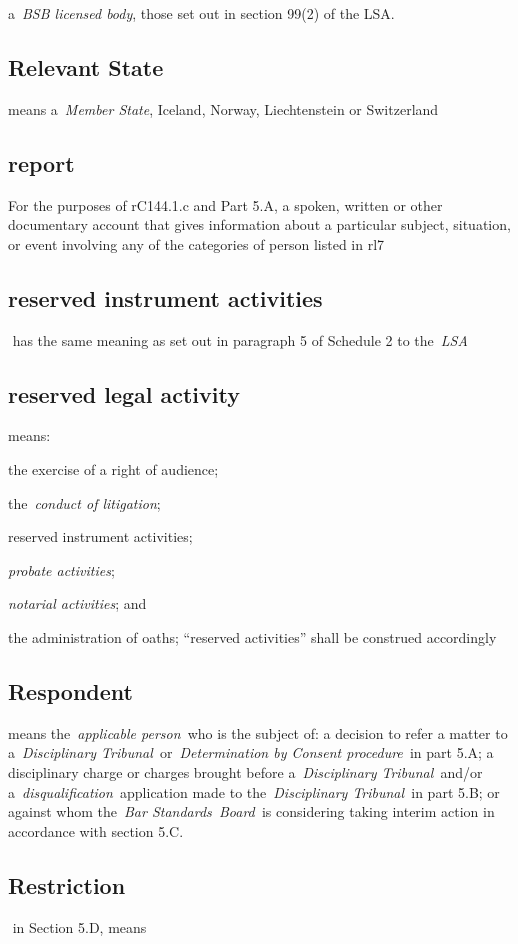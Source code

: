   a~\emph{BSB licensed body}, those set out in section 99(2) of the
  LSA.\la  \subsection{Relevant State } means a~\emph{Member State}, Iceland,
  Norway, Liechtenstein or Switzerland  \subsection{report }For the purposes of rC144.1.c and Part 5.A, a spoken,
  written or other documentary account that gives information about a
  particular subject, situation, or event involving any of the
  categories of person listed in rl7 \subsection{reserved instrument activities } has the same meaning as set
  out in paragraph 5 of Schedule 2 to the~\emph{LSA} \subsection{reserved legal activity } means:
\al \item the exercise of a right
  of audience;
   \item the~\emph{conduct of litigation};  \item reserved
  instrument activities;  \item \emph{probate activities};  \item \emph{notarial
  activities}; and  \item the administration of oaths;\la ``reserved
  activities'' shall be construed accordingly  \subsection{Respondent } means the~\emph{applicable person~}who is the
  subject of: a decision to refer a matter to a~\emph{Disciplinary
  Tribunal~}or~\emph{Determination by Consent procedure~}in part 5.A; a
  disciplinary charge or charges brought before a~\emph{Disciplinary
  Tribunal~}and/or a~\emph{disqualification~}application made to
  the~\emph{Disciplinary Tribunal~}in part 5.B; or against whom
  the~\emph{Bar Standards~Board~}is considering taking interim action in
  accordance with section 5.C.  \subsection{Restriction } in Section 5.D, means
